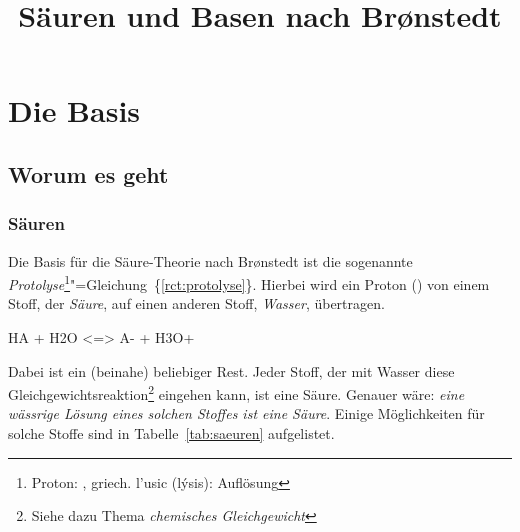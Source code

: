 \documentclass{arbeitsblatt}
\title{Säuren und Basen nach Br\o nstedt}
\newcommand*\rctref[1]{\{\ref{#1}\}}
\begin{document}
\maketitle

\section{Die Basis}
\subsection{Worum es geht}
\subsubsection{Säuren}
Die Basis für die Säure-Theorie nach Br\o nstedt ist die sogenannte
\emph{Protolyse}\footnote{Proton: \Hpl, griech. \textgreek{l'usic} (l\'ysis):
  Auflösung}"=Gleichung~\rctref{rct:protolyse}.  Hierbei wird ein Proton
(\Hpl) von einem Stoff, der \emph{Säure}, auf einen anderen Stoff,
\emph{Wasser}, übertragen.
\begin{reaction}
  HA + H2O <=> A- + H3O+ \label{rct:protolyse}
\end{reaction}
Dabei ist  ein (beinahe) beliebiger Rest.  Jeder Stoff, der mit Wasser
diese Gleichgewichtsreaktion\footnote{Siehe dazu Thema \emph{chemisches
  Gleichgewicht}} eingehen kann, ist eine Säure.  Genauer wäre: \emph{eine
wässrige Lösung eines solchen Stoffes ist eine Säure}.  Einige Möglichkeiten
für solche Stoffe sind in Tabelle~\ref{tab:saeuren} aufgelistet.
\end{document}
